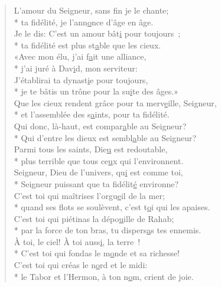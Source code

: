 
\begin{verse}
L’amour du Seigneur, sans f\underline{i}n je le chante; \\*
ta fidélité, je l’ann\underline{o}nce d’âge en âge. \\
Je le dis: C’est un amour bât\underline{i} pour toujours ; \\*
ta fidélité est plus st\underline{a}ble que les cieux. \\

«Avec mon élu, j’ai f\underline{a}it une alliance, \\*
j’ai juré à Dav\underline{i}d, mon serviteur: \\
J’établirai ta dynast\underline{i}e pour toujours, \\*
je te bâtis un trône pour la su\underline{i}te des âges.» \\

Que les cieux rendent grâce pour ta merv\underline{e}ille, Seigneur, \\*
et l’assemblée des s\underline{a}ints, pour ta fidélité. \\
Qui donc, là-haut, est compar\underline{a}ble au Seigneur? \\*
Qui d’entre les dieux est sembl\underline{a}ble au Seigneur? \\

Parmi tous les saints, Die\underline{u} est redoutable, \\*
plus terrible que tous ce\underline{u}x qui l’environnent. \\
Seigneur, Dieu de l’univers, qu\underline{i} est comme toi, \\*
Seigneur puissant que ta fidélit\underline{é} environne? \\

C’est toi qui maîtrises l’orgu\underline{e}il de la mer; \\*
quand ses flots se soulèvent, c’est t\underline{o}i qui les apaises. \\
C’est toi qui piétinas la dépo\underline{u}ille de Rahab; \\*
par la force de ton bras, tu dispers\underline{a}s tes ennemis. \\

À toi, le ciel! À toi auss\underline{i}, la terre ! \\*
C’est toi qui fondas le m\underline{o}nde et sa richesse! \\
C’est toi qui créas le n\underline{o}rd et le midi: \\*
le Tabor et l’Hermon, à ton n\underline{o}m, crient de joie. \\


\end{verse}
